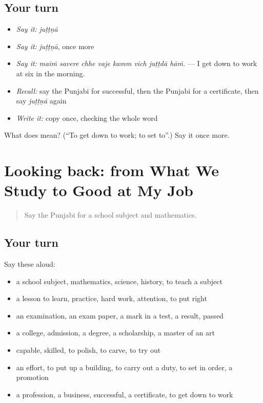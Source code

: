 \subsection*{Your turn}
\begin{itemize}
\raggedright
  \item \emph{Say it:} \emph{juṭṭṇā}
  \item \emph{Say it:} \emph{juṭṭṇā}, once more
  \item \emph{Say it:} \emph{maiṁ savere chhe vaje kamm vich juṭṭdā hāṁ.} — I get down to work at six in the morning.
  \item \emph{Recall:} say the Punjabi for successful, then the Punjabi for a certificate, then say \emph{juṭṭṇā} again
  \item \emph{Write it:} copy \textbf{} once, checking the whole word
\end{itemize}

\begin{tcolorbox}[breakable,colback=teal!4,colframe=teal!35!black,title={Before you move on}]
What does  mean? (\textquotedblleft{}To get down to work; to set to\textquotedblright{}.) Say it once more.
\end{tcolorbox}
\section[(dialogue)]{Looking back: from What We Study to Good at My Job}

\label{lesson:PA-R364-review-358-364}



\begin{quote}
Say the Punjabi for a school subject and mathematics.
\end{quote}

\subsection*{Your turn}
Say these aloud:

\begin{itemize}
\raggedright
  \item a school subject, mathematics, science, history, to teach a subject
  \item a lesson to learn, practice, hard work, attention, to put right
  \item an examination, an exam paper, a mark in a test, a result, passed
  \item a college, admission, a degree, a scholarship, a master of an art
  \item capable, skilled, to polish, to carve, to try out
  \item an effort, to put up a building, to carry out a duty, to set in order, a promotion
  \item a profession, a business, successful, a certificate, to get down to work
\end{itemize}


